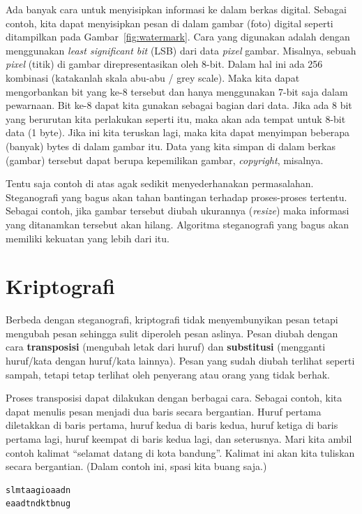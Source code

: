 Ada banyak cara untuk menyisipkan informasi ke dalam berkas digital. Sebagai
contoh, kita dapat menyisipkan pesan di dalam gambar (foto) digital seperti
ditampilkan pada Gambar~\ref{fig:watermark}. Cara yang digunakan adalah
dengan menggunakan {\em least significant bit} (LSB) dari data {\em pixel}
gambar. Misalnya, sebuah {\em pixel} (titik) di gambar direpresentasikan oleh
8-bit. Dalam hal ini ada 256 kombinasi (katakanlah skala abu-abu / grey scale).
Maka kita dapat mengorbankan bit yang ke-8 tersebut dan hanya menggunakan 7-bit
saja dalam pewarnaan. Bit ke-8 dapat kita gunakan sebagai bagian dari data.
Jika ada 8 bit yang berurutan kita perlakukan seperti itu, maka akan ada tempat
untuk 8-bit data (1 byte). Jika ini kita teruskan lagi, maka kita dapat
menyimpan beberapa (banyak) bytes di dalam gambar itu.
Data yang kita simpan di dalam berkas (gambar) tersebut dapat berupa
kepemilikan gambar, {\em copyright}, misalnya. 

Tentu saja contoh di atas agak sedikit menyederhanakan permasalahan.
Steganografi yang bagus akan tahan bantingan terhadap proses-proses tertentu.
Sebagai contoh, jika gambar tersebut diubah ukurannya ({\em resize}) maka
informasi yang ditanamkan tersebut akan hilang. Algoritma steganografi yang
bagus akan memiliki kekuatan yang lebih dari itu.


\section{Kriptografi}
Berbeda dengan steganografi, kriptografi tidak menyembunyikan pesan tetapi
mengubah pesan sehingga sulit diperoleh pesan aslinya. Pesan diubah dengan cara
{\bf transposisi} (mengubah letak dari huruf) dan {\bf substitusi} (mengganti
huruf/kata dengan huruf/kata lainnya). Pesan yang sudah diubah terlihat seperti
sampah, tetapi tetap terlihat oleh penyerang atau orang yang tidak berhak.

Proses transposisi dapat dilakukan dengan berbagai cara. Sebagai contoh, kita
dapat menulis pesan menjadi dua baris secara bergantian. Huruf pertama
diletakkan di baris pertama, huruf kedua di baris kedua, huruf ketiga di baris
pertama lagi, huruf keempat di baris kedua lagi, dan seterusnya. Mari kita
ambil contoh kalimat ``selamat datang di kota bandung''. Kalimat ini akan kita
tuliskan secara bergantian. (Dalam contoh ini, spasi kita buang saja.)

\begin{mdframed}
\begin{verbatim}
slmtaagioaadn
eaadtndktbnug
\end{verbatim}
\end{mdframed}

